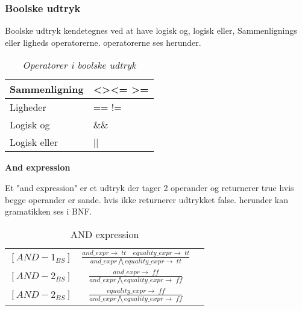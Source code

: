 \subsubsection{Boolske udtryk}
Boolske udtryk kendetegnes ved at have logisk og, logisk eller, Sammenlignings eller ligheds operatorerne. operatorerne ses herunder.

\begin{table}[H]
    \centering
    \begin{tabular}{|l|l|}
        \hline
        \centering

        Sammenligning      & \textless \quad \textgreater \quad \textless= \quad\textgreater= \\ \hline
        Ligheder           & == \quad !=                                                      \\ \hline
        Logisk og          & \&\&                                                              \\ \hline
        Logisk eller       & ||                                                               \\ \hline


    \end{tabular}
    \caption{\textit{Operatorer i boolske udtryk}}
    \label{tab:operatorprioritering}
\end{table}

\noindent\textbf{And expression}

\noindent Et "and expression" er et udtryk der tager 2 operander og returnerer true hvis begge operander er sande. hvis ikke returnerer udtrykket false.
herunder kan gramatikken ses i BNF.



    \bgroup
    \def\arraystretch{3}
    \begin{table}[H]
    \centering
    \begin{tabular}{l c l}
        
        $[AND-1_{BS}]$ &$\frac{and\_expr \rightarrow \; tt \quad equality\_expr \rightarrow \; tt}{and\_expr \bigwedge equality\_expr \rightarrow \; tt}$ & \\
    
        $[AND-2_{BS}]$ &$\frac{and\_expr \rightarrow \; ff}{and\_expr \bigwedge equality\_expr \rightarrow \; ff}$ & \\
        
        $[AND-2_{BS}]$ &$\frac{equality\_expr \rightarrow \; ff}{and\_expr \bigwedge equality\_expr \rightarrow \; ff}$ & \\
        
    \end{tabular}
    \caption{AND expression}
    \label{tab:andexpr}
    \end{table}
    \egroup

